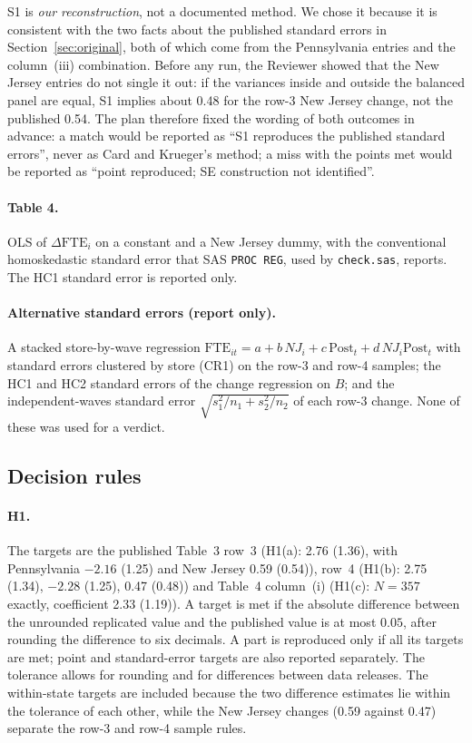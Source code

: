 \documentclass[11pt]{article}
\begin{document}
S1 is \emph{our reconstruction}, not a documented method. We chose it because it is
consistent with the two facts about the published standard errors in
Section~\ref{sec:original}, both of which come from the Pennsylvania entries and the
column~(iii) combination. Before any run, the Reviewer showed that the New Jersey entries do
not single it out: if the variances inside and outside the balanced panel are equal, S1
implies about 0.48 for the row-3 New Jersey change, not the published 0.54. The plan
therefore fixed the wording of both outcomes in advance: a match would be reported as ``S1
reproduces the published standard errors'', never as Card and Krueger's method; a miss with
the points met would be reported as ``point reproduced; SE construction not identified''.

\paragraph{Table 4.} OLS of $\Delta\text{FTE}_i$ on a constant and a New Jersey dummy, with
the conventional homoskedastic standard error that SAS \texttt{PROC REG}, used by
\texttt{check.sas}, reports. The HC1 standard error is reported only.

\paragraph{Alternative standard errors (report only).} A stacked store-by-wave regression
$\text{FTE}_{it} = a + b\,NJ_i + c\,\text{Post}_t + d\,NJ_i\text{Post}_t$ with standard errors
clustered by store (CR1) on the row-3 and row-4 samples; the HC1 and HC2 standard errors of
the change regression on $B$; and the independent-waves standard error
$\sqrt{s_1^2/n_1 + s_2^2/n_2}$ of each row-3 change. None of these was used for a verdict.

\subsection{Decision rules}

\paragraph{H1.} The targets are the published Table~3 row~3 (H1(a): 2.76 (1.36), with
Pennsylvania $-2.16$ (1.25) and New Jersey 0.59 (0.54)), row~4 (H1(b): 2.75 (1.34),
$-2.28$ (1.25), 0.47 (0.48)) and Table~4 column~(i) (H1(c): $N = 357$ exactly, coefficient
2.33 (1.19)). A target is met if the absolute difference between the unrounded replicated
value and the published value is at most $0.05$, after rounding the difference to six
decimals. A part is reproduced only if all its targets are met; point and standard-error
targets are also reported separately. The tolerance allows for rounding and for differences
between data releases. The within-state targets are included because the two difference
estimates lie within the tolerance of each other, while the New Jersey changes (0.59 against
0.47) separate the row-3 and row-4 sample rules.
\end{document}
